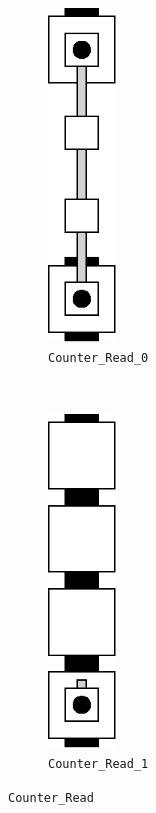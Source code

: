 \begin{figure}[H]
    \centering
    \begin{subfigure}[t]{0.2\textwidth}
        \centering
        \includegraphics[width=0.2\textwidth]{read/read_0}
        \caption{\label{fig:read_0} {\tt Counter\_Read\_0}}
    \end{subfigure}%
    ~
    \begin{subfigure}[t]{0.2\textwidth}
        \centering
        \includegraphics[width=0.2\textwidth]{read/read_1}
        \caption{\label{fig:read_1} {\tt Counter\_Read\_1}}
    \end{subfigure}%
    \caption{\label{fig:digit_read} {\tt {Counter\_Read}}}
\end{figure}

